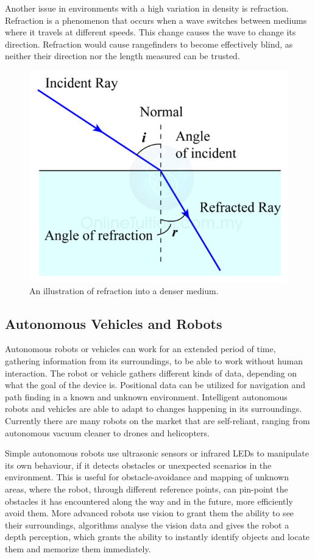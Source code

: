 Another issue in environments with a high variation in density is refraction. Refraction is a phenomenon that occurs when a wave switches between mediums where it travels at different speeds. This change causes the wave to change its direction. %
Refraction would cause rangefinders to become effectively blind, as neither their direction nor the length measured can be trusted.

\begin{figure}[H]
	\centering
	\includegraphics[width=.4\linewidth]{images/refraction.png}
	\caption{An illustration of refraction into a denser medium.}
	\label{fig:refractionIMG}
\end{figure}

\subsection{Autonomous Vehicles and Robots}

Autonomous robots or vehicles can work for an extended period of time, gathering information from its surroundings, to be able to work without human interaction. The robot or vehicle gathers different kinds of data, depending on what the goal of the device is. Positional data can be utilized for navigation and path finding in a known and unknown environment. Intelligent autonomous robots and vehicles are able to adapt to changes happening in its surroundings.
Currently there are many robots on the market that are self-reliant, ranging from autonomous vacuum cleaner to drones and helicopters\cite{autonomousbasic}.

Simple autonomous robots use ultrasonic sensors or infrared LEDs to manipulate its own behaviour, if it detects obstacles or unexpected scenarios in the environment. This is useful for obstacle-avoidance and mapping of unknown areas, where the robot, through different reference points, can pin-point the obstacles it has encountered along the way and in the future, more efficiently avoid them.
More advanced robots use vision to grant them the ability to see their surroundings, algorithms analyse the vision data and gives the robot a depth perception, which grants the ability to instantly identify objects and locate them and memorize them immediately\cite{obstacles}.

